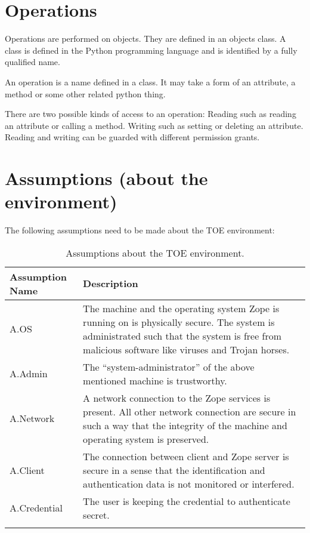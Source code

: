 \documentclass[12pt,english]{scrbook}
\begin{document}



\section{Operations}

Operations are performed on objects. They are defined in an objects class. A
class is defined in the Python programming language and is identified by a
fully qualified name.

An operation is a name defined in a class. It may take a form of an attribute,
a method or some other related python thing.

There are two possible kinds of access to an operation: Reading such as
reading an attribute or calling a method. Writing such as setting or deleting
an attribute. Reading and writing can be guarded with different permission
grants.





\section{Assumptions (about the environment)}

The following assumptions need to be made about the TOE environment:

\begin{longtable}[c]{lp{10cm}}
  \toprule
  Assumption Name & Description \\
  \midrule

  A.OS & 
  The machine and the operating system Zope is running on is physically secure.
  The system is administrated such that the system is free from malicious
  software like viruses and Trojan horses.  \\

  A.Admin & 
  The ``system-administrator'' of the above
  mentioned machine is trustworthy.
   \\

  A.Network & 
  A network connection to the Zope services is
  present. All other network connection are
  secure in such a way that the integrity of
  the machine and operating system is preserved.
   \\

  A.Client & 
  The connection between client and Zope server is
  secure in a sense that the identification and
  authentication data is not monitored or interfered.
   \\

  A.Credential & 
  The user is keeping the credential to authenticate
  secret. \\

  \bottomrule
  \caption{Assumptions about the TOE environment.}
  \label{tab-A}
\end{longtable}
\end{document}
